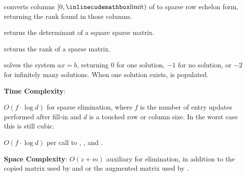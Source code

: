 \begin{compactitem}
  \item {} converts columns $[0, {\inlinecodemath{limit}})$ of  to sparse row echelon form, returning the rank found in those columns.
  \item {} returns the determinant of a square sparse matrix.
  \item {} returns the rank of a sparse matrix.
  \item {} solves the system $ax = b$, returning $0$ for one solution, $-1$ for no solution, or $-2$ for infinitely many solutions. When one solution exists,  is populated.
\end{compactitem}

\textbf{Time Complexity}:
\begin{compactitem}
  \item $O(f \cdot \log d)$ for sparse elimination, where $f$ is the number of entry updates performed after fill-in and $d$ is a touched row or column size. In the worst case this is still cubic.
  \item $O(f \cdot \log d)$ per call to , , and .
\end{compactitem}

\textbf{Space Complexity}: $O(z + m)$ auxiliary for elimination, in addition to the copied matrix used by  and  or the augmented matrix used by .

